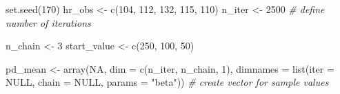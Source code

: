 \documentclass[
  12pt,
]{book}
\newenvironment{Shaded}{\begin{snugshade}}{\end{snugshade}}
\newcommand{\AttributeTok}[1]{\textcolor[rgb]{0.77,0.63,0.00}{#1}}
\newcommand{\CommentTok}[1]{\textcolor[rgb]{0.56,0.35,0.01}{\textit{#1}}}
\newcommand{\ConstantTok}[1]{\textcolor[rgb]{0.00,0.00,0.00}{#1}}
\newcommand{\DecValTok}[1]{\textcolor[rgb]{0.00,0.00,0.81}{#1}}
\newcommand{\FunctionTok}[1]{\textcolor[rgb]{0.00,0.00,0.00}{#1}}
\newcommand{\NormalTok}[1]{#1}
\newcommand{\OtherTok}[1]{\textcolor[rgb]{0.56,0.35,0.01}{#1}}
\newcommand{\StringTok}[1]{\textcolor[rgb]{0.31,0.60,0.02}{#1}}
\begin{document}
\begin{Shaded}
\begin{Highlighting}[]
\FunctionTok{set.seed}\NormalTok{(}\DecValTok{170}\NormalTok{)}
\NormalTok{hr\_obs }\OtherTok{\textless{}{-}} \FunctionTok{c}\NormalTok{(}\DecValTok{104}\NormalTok{, }\DecValTok{112}\NormalTok{, }\DecValTok{132}\NormalTok{, }\DecValTok{115}\NormalTok{, }\DecValTok{110}\NormalTok{)}
\NormalTok{n\_iter }\OtherTok{\textless{}{-}} \DecValTok{2500} \CommentTok{\# define number of iterations}

\NormalTok{n\_chain }\OtherTok{\textless{}{-}} \DecValTok{3}
\NormalTok{start\_value }\OtherTok{\textless{}{-}} \FunctionTok{c}\NormalTok{(}\DecValTok{250}\NormalTok{, }\DecValTok{100}\NormalTok{, }\DecValTok{50}\NormalTok{)}

\NormalTok{pd\_mean }\OtherTok{\textless{}{-}} \FunctionTok{array}\NormalTok{(}\ConstantTok{NA}\NormalTok{, }\AttributeTok{dim =} \FunctionTok{c}\NormalTok{(n\_iter, n\_chain, }\DecValTok{1}\NormalTok{), }\AttributeTok{dimnames =} \FunctionTok{list}\NormalTok{(}\AttributeTok{iter =} \ConstantTok{NULL}\NormalTok{, }\AttributeTok{chain =} \ConstantTok{NULL}\NormalTok{, }\AttributeTok{params =} \StringTok{"beta"}\NormalTok{)) }\CommentTok{\# create vector for sample values}


\end{Highlighting}
\end{Shaded}
\end{document}
